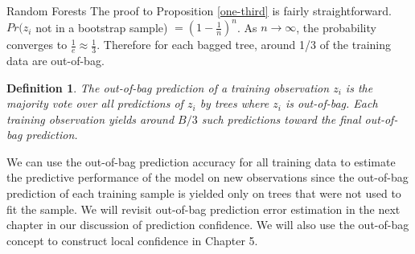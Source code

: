 \documentclass[12pt]{pom_thesis}
\newtheorem{definition}{Definition}[section]
\begin{document}
\begin{chapter}{Random Forests}
The proof to Proposition \ref{one-third} is fairly straightforward. $Pr(z_i$ not in a bootstrap sample) $= (1-\frac{1}{n})^n $. As $n \to \infty$, the probability converges to $\frac{1}{e} \approx \frac{1}{3}$. Therefore for each bagged tree, around 1/3 of the training data are out-of-bag.

\begin{definition}
\label{oob-prediction}
The out-of-bag prediction of a training observation $z_i$ is the majority vote over all predictions of $z_i$ by trees where $z_i$ is out-of-bag. Each training observation yields around $B/3$ such predictions toward the final out-of-bag prediction.
\end{definition}

We can use the out-of-bag prediction accuracy for all training data to estimate the predictive performance of the model on new observations since the out-of-bag prediction of each training sample is yielded only on trees that were not used to fit the sample. We will revisit out-of-bag prediction error estimation in the next chapter in our discussion of prediction confidence. We will also use the out-of-bag concept to construct local confidence in Chapter 5. 
\end{chapter}


\end{document}
